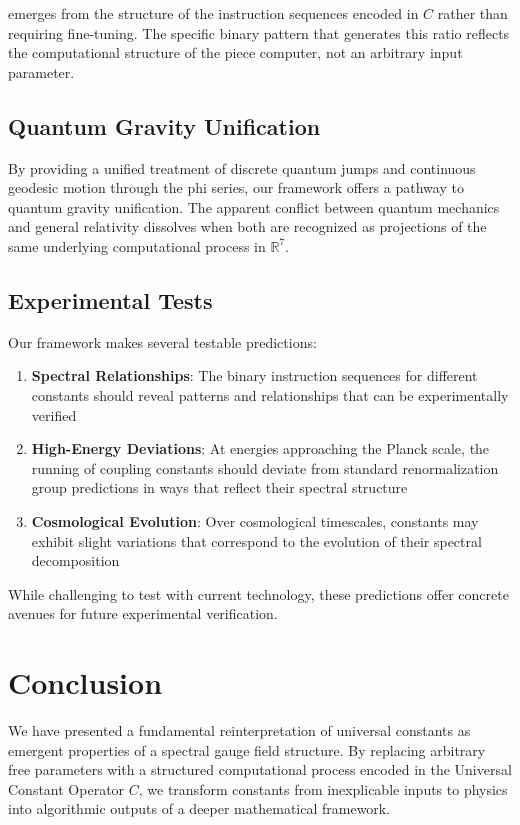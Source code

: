 \documentclass{article}
\begin{document}
emerges from the structure of the instruction sequences encoded in $C$ rather than requiring fine-tuning. The specific binary pattern that generates this ratio reflects the computational structure of the piece computer, not an arbitrary input parameter.

\subsection{Quantum Gravity Unification}

By providing a unified treatment of discrete quantum jumps and continuous geodesic motion through the phi series, our framework offers a pathway to quantum gravity unification. The apparent conflict between quantum mechanics and general relativity dissolves when both are recognized as projections of the same underlying computational process in $\mathbb{R}^7$.

\subsection{Experimental Tests}

Our framework makes several testable predictions:

\begin{enumerate}
\item \textbf{Spectral Relationships}: The binary instruction sequences for different constants should reveal patterns and relationships that can be experimentally verified
    
\item \textbf{High-Energy Deviations}: At energies approaching the Planck scale, the running of coupling constants should deviate from standard renormalization group predictions in ways that reflect their spectral structure
    
\item \textbf{Cosmological Evolution}: Over cosmological timescales, constants may exhibit slight variations that correspond to the evolution of their spectral decomposition
\end{enumerate}

While challenging to test with current technology, these predictions offer concrete avenues for future experimental verification.

\section{Conclusion}

We have presented a fundamental reinterpretation of universal constants as emergent properties of a spectral gauge field structure. By replacing arbitrary free parameters with a structured computational process encoded in the Universal Constant Operator $C$, we transform constants from inexplicable inputs to physics into algorithmic outputs of a deeper mathematical framework.
\end{document}
